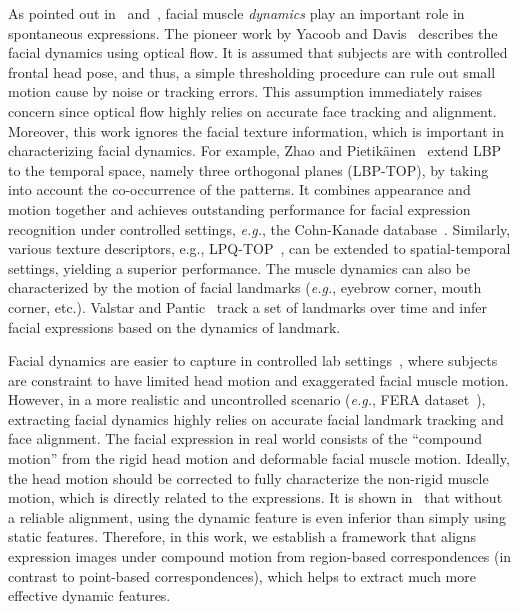 \documentclass[journal]{IEEEtran}
\begin{document}
As pointed out in~\cite{Ekman2005} and~\cite{Ambadar05}, facial muscle \textit{dynamics} play an important role in spontaneous expressions. The pioneer work by Yacoob and Davis~\cite{Yacoob_PAMI96} describes the facial dynamics using optical flow. It is assumed that subjects are with controlled frontal head pose, and thus, a simple thresholding procedure can rule out small motion cause by noise or tracking errors. This assumption immediately raises concern since optical flow highly relies on accurate face tracking and alignment. Moreover, this work ignores the facial texture information, which is important in characterizing facial dynamics. For example, Zhao and Pietik\"ainen~\cite{Zhao_PAMI07} extend LBP to the temporal space, namely three orthogonal planes (LBP-TOP), by taking into account the co-occurrence of the patterns. It combines appearance and motion together and achieves outstanding performance for facial expression recognition under controlled settings, \textit{e.g.}, the Cohn-Kanade database~\cite{CKplus}. Similarly, various texture descriptors, e.g., LPQ-TOP~\cite{LPQ-TOP}, can be extended to spatial-temporal settings, yielding a superior performance. The muscle dynamics can also be characterized by the motion of facial landmarks (\textit{e.g.}, eyebrow corner, mouth corner, etc.). Valstar and Pantic~\cite{Valstar_SMCB12} track a set of landmarks over time and infer facial expressions based on the dynamics of landmark. 

Facial dynamics are easier to capture in controlled lab settings~\cite{CKplus}, where subjects are constraint to have limited head motion and exaggerated facial muscle motion. However, in a more realistic and uncontrolled scenario (\textit{e.g.}, FERA dataset~\cite{Valstar_FERA11}), extracting facial dynamics highly relies on accurate facial landmark tracking and face alignment. The facial expression in real world consists of the ``compound motion'' from the rigid head motion and deformable facial muscle motion. Ideally, the head motion should be corrected to fully characterize the non-rigid muscle motion, which is directly related to the expressions. It is shown in~\cite{Valstar12,Yang_SMCB12} that without a reliable alignment, using the dynamic feature is even inferior than simply using static features. Therefore, in this work, we establish a framework that aligns expression images under compound motion from region-based correspondences (in contrast to point-based correspondences), which helps to extract much more effective dynamic features. 
\end{document}
